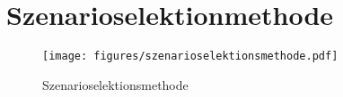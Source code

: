 
\chapter{Szenarioselektionmethode}
\label{chapter:szenarioselectionmethod}

\begin{figure}[!ht]
  \centering
  \texttt{[image: figures/szenarioselektionsmethode.pdf]}
  \caption{Szenarioselektionsmethode}
  \label{fig:szenarioselektionsmethode}
\end{figure}